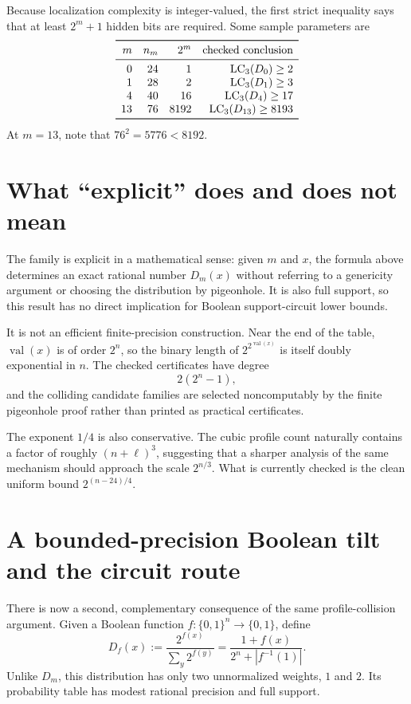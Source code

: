 \documentclass[11pt]{article}
\newcommand{\bits}{\{0,1\}}
\newcommand{\LC}{\operatorname{LC}}
\newcommand{\val}{\operatorname{val}}
\begin{document}
Because localization complexity is integer-valued, the first strict
inequality says that at least $2^m+1$ hidden bits are required.  Some sample
parameters are
\[
\begin{array}{rrrr}
\toprule
m & n_m & 2^m & \text{checked conclusion}\\
\midrule
0  & 24 & 1    & \LC_3(D_0)\ge 2\\
1  & 28 & 2    & \LC_3(D_1)\ge 3\\
4  & 40 & 16   & \LC_3(D_4)\ge 17\\
13 & 76 & 8192 & \LC_3(D_{13})\ge 8193\\
\bottomrule
\end{array}
\]
At $m=13$, note that $76^2=5776<8192$.

\section{What ``explicit'' does and does not mean}

The family is explicit in a mathematical sense: given $m$ and $x$, the
formula above determines an exact rational number $D_m(x)$ without referring
to a genericity argument or choosing the distribution by pigeonhole.  It is
also full support, so this result has no direct implication for Boolean
support-circuit lower bounds.

It is not an efficient finite-precision construction.  Near the end of the
table, $\val(x)$ is of order $2^n$, so the binary length of
$2^{2^{\val(x)}}$ is itself doubly exponential in $n$.  The checked
certificates have degree
\[
  2(2^n-1),
\]
and the colliding candidate families are selected noncomputably by the finite
pigeonhole proof rather than printed as practical certificates.

The exponent $1/4$ is also conservative.  The cubic profile count naturally
contains a factor of roughly $(n+\ell)^3$, suggesting that a sharper analysis
of the same mechanism should approach the scale $2^{n/3}$.  What is currently
checked is the clean uniform bound $2^{(n-24)/4}$.

\section{A bounded-precision Boolean tilt and the circuit route}

There is now a second, complementary consequence of the same profile-collision
argument.  Given a Boolean function $f:\bits^n\to\bits$, define
\[
  D_f(x):=\frac{2^{f(x)}}{\sum_y 2^{f(y)}}
  =\frac{1+f(x)}{2^n+|f^{-1}(1)|}.
\]
Unlike $D_m$, this distribution has only two unnormalized weights, $1$ and
$2$.  Its probability table has modest rational precision and full support.
\end{document}

